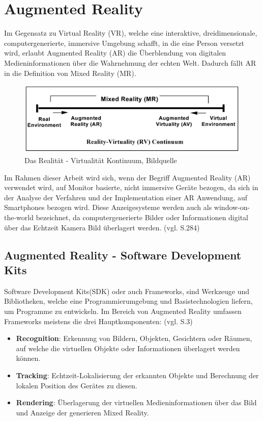 \chapter{Augmented Reality}

Im Gegensatz zu \glqq Virtual Reality\grqq{} (VR), welche eine interaktive, dreidimensionale, computergenerierte, immersive Umgebung schafft, in die eine Person versetzt wird, erlaubt \glqq Augmented Reality\grqq{} (AR) die Überblendung von digitalen Medieninformationen über die Wahrnehmung der echten Welt. Dadurch fällt AR in die Definition von \glqq Mixed Reality\grqq{} (MR).

\begin{figure}[H]
	\centering
	\includegraphics[scale=0.52]{ar_vr.png}
	\caption{Das Realität - Virtualität Kontinuum, Bildquelle \cite{ar_vr}}
\end{figure} 

Im Rahmen dieser Arbeit wird sich, wenn der Begriff Augmented Reality (AR) verwendet wird, auf Monitor basierte, nicht immersive Geräte bezogen, da sich in der Analyse der Verfahren und der Implementation einer AR Anwendung, auf Smartphones bezogen wird. Diese Anzeigesysteme werden auch als \glqq window-on-the-world\grqq{} bezeichnet, da computergenerierte Bilder oder Informationen digital über das Echtzeit Kamera Bild überlagert werden. (vgl. \cite{ar_vr} S.284)



\section{Augmented Reality - Software Development Kits}

\glqq Software Development Kits\grqq (SDK) oder auch Frameworks, sind Werkzeuge und Bibliotheken, welche eine Programmierumgebung und Basistechnologien liefern, um Programme zu entwickeln. Im Bereich von Augmented Reality umfassen Frameworks meistens die drei Hauptkomponenten: (vgl. \cite{sdks} S.3)

\begin{itemize}

\item \textbf{Recognition}: Erkennung von Bildern, Objekten, Gesichtern oder Räumen, auf welche die virtuellen Objekte oder Informationen überlagert werden können.


\item \textbf{Tracking}: Echtzeit-Lokalisierung der erkannten Objekte und Berechnung der lokalen Position des Gerätes zu diesen.

\item \textbf{Rendering}: Überlagerung der virtuellen Medieninformationen über das Bild und Anzeige der generieren Mixed Reality.
\end{itemize}

